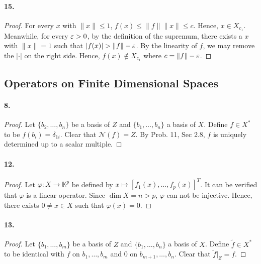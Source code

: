   \paragraph{15.}
  \begin{proof}
    For every $x$ with $\|x\|\le 1$, $f(x)\le \|f\|\|x\|\le c$. Hence, $x\in 
    X_{c_1}$. Meanwhile, for every $\varepsilon>0$, by the definition of the supremum,
    there exists a $x$ with $\|x\|=1$ such that $|f(x)|>\|f\|-\vep$. By the 
    linearity of $f$, we may remove the $|\cdot|$ on the right side. Hence, 
    $f(x)\notin X_{c_1}$ where $c=\|f\|-\varepsilon$.
  \end{proof}

\subsection{Operators on Finite Dimensional Spaces}
  \paragraph{8.}
  \begin{proof}
    Let $\{b_2,\dots,b_n\}$ be a basis of $Z$ and $\{b_1,\dots,b_n\}$ a basis of
    $X$. Define $f\in X^*$ to be $f(b_i)=\delta_{1i}$. Clear that $\mathcal{N}
    (f)=Z$. By Prob. 11, Sec 2.8, $f$ is uniquely determined up to a scalar 
    multiple.
  \end{proof}

  \paragraph{12.}
  \begin{proof}
    Let $\varphi:X\to\mathbb{K}^p$ be defined by $x\mapsto [f_1(x),\dots,
    f_p(x)]^T$. It can be verified that $\varphi$ is a linear operator. Since 
    $\dim X=n>p$, $\varphi$ can not be injective. Hence, there exists $0\ne x\in
    X$ such that $\varphi(x)=0$.
  \end{proof}

  \paragraph{13.}
  \begin{proof}
    Let $\{b_1,\dots,b_m\}$ be a basis of $Z$ and $\{b_1,\dots,b_n\}$ a basis of
    $X$. Define $\tilde{f}\in X^*$ to be identical with $f$ on $b_1,\dots,b_m$
    and $0$ on $b_{m+1},\dots,b_n$. Clear that $\tilde{f}|_Z=f$.
  \end{proof}

